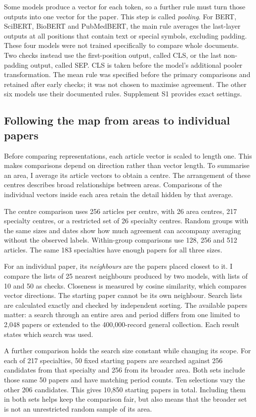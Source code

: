Some models produce a vector for each token, so a further rule must turn those outputs into one vector for the paper. This step is called \emph{pooling}. For BERT, SciBERT, BioBERT and PubMedBERT, the main rule averages the last-layer outputs at all positions that contain text or special symbols, excluding padding. These four models were not trained specifically to compare whole documents. Two checks instead use the first-position output, called CLS, or the last non-padding output, called SEP. CLS is taken before the model's additional pooler transformation. The mean rule was specified before the primary comparisons and retained after early checks; it was not chosen to maximise agreement. The other six models use their documented rules. Supplement S1 provides exact settings.


\subsection{Following the map from areas to individual papers}
Before comparing representations, each article vector is scaled to length one. This makes comparisons depend on direction rather than vector length. To summarise an area, I average its article vectors to obtain a centre. The arrangement of these centres describes broad relationships between areas. Comparisons of the individual vectors inside each area retain the detail hidden by that average.

The centre comparison uses 256 articles per centre, with 26 area centres, 217 specialty centres, or a restricted set of 26 specialty centres. Random groups with the same sizes and dates show how much agreement can accompany averaging without the observed labels. Within-group comparisons use 128, 256 and 512 articles. The same 183 specialties have enough papers for all three sizes.

For an individual paper, its \emph{neighbours} are the papers placed closest to it. I compare the lists of 25 nearest neighbours produced by two models, with lists of 10 and 50 as checks. Closeness is measured by cosine similarity, which compares vector directions. The starting paper cannot be its own neighbour. Search lists are calculated exactly and checked by independent sorting. The available papers matter: a search through an entire area and period differs from one limited to 2,048 papers or extended to the 400,000-record general collection. Each result states which search was used.

A further comparison holds the search size constant while changing its scope. For each of 217 specialties, 50 fixed starting papers are searched against 256 candidates from that specialty and 256 from its broader area. Both sets include those same 50 papers and have matching period counts. Ten selections vary the other 206 candidates. This gives 10,850 starting papers in total. Including them in both sets helps keep the comparison fair, but also means that the broader set is not an unrestricted random sample of its area.


